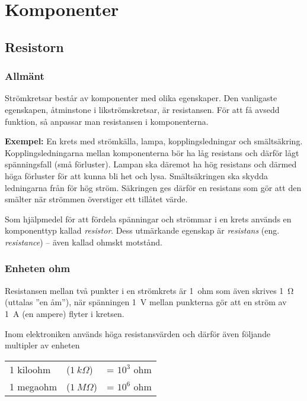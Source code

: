 \chapter{Komponenter}
\label{komponenter}

\section{Resistorn}

\subsection{Allmänt}

Strömkretsar består av komponenter med olika egenskaper.
Den vanligaste egenskapen, åtminstone i likströmskretsar, är resistansen.
För att få avsedd funktion, så anpassar man resistansen i komponenterna.

\textbf{Exempel:} En krets med strömkälla, lampa, kopplingsledningar och smältsäkring.
Kopplingsledningarna mellan komponenterna bör ha låg resistans och därför lågt
spänningsfall (små förluster).
Lampan ska däremot ha hög resistans och därmed höga förluster för att kunna bli
het och lysa.
Smältsäkringen ska skydda ledningarna från för hög ström.
Säkringen ges därför en resistans som gör att den smälter när strömmen
överstiger ett tillåtet värde.

Som hjälpmedel för att fördela spänningar och strömmar i en krets används
en komponenttyp kallad \emph{resistor}.
Dess utmärkande egenskap är \emph{resistans} (eng. \emph{resistance}) --
även kallad ohmskt motstånd.

\subsection{Enheten ohm}


Resistansen mellan två punkter i en strömkrets är 1~ohm som även skrives
\SI{1}{\ohm} (uttalas ''en åm''), när spänningen \SI{1}{\volt} mellan punkterna
gör att en ström av \SI{1}{\ampere} (en ampere) flyter i kretsen.

Inom elektroniken används höga resistansvärden och därför även följande
multipler av enheten

\begin{center}
\begin{tabular}{lll}
  1 kiloohm & (\(1\ k\Omega\)) & = \(10^3\) ohm \\
  1 megaohm & (\(1\ M\Omega\)) & = \(10^6\) ohm \\
\end{tabular}
\end{center}

